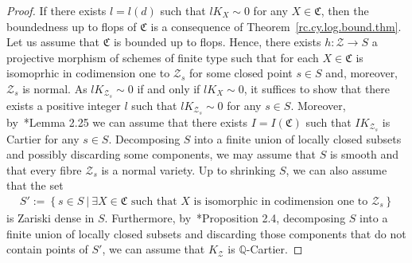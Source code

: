 \documentclass[11pt]{ip-journal}
\theoremstyle{definition}
\begin{document}
\begin{proof}
If there exists $l=l(d)$ such that $lK_X \sim 0$ for any $X \in \mathfrak{C}$, then the boundedness up to flops of $\mathfrak{C}$ is a consequence of Theorem~\ref{rc.cy.log.bound.thm}.
\newline
Let us assume that $\mathfrak{C}$ is bounded up to flops.
Hence, there exists  $h\colon \mathcal{Z}\rightarrow S$ a projective morphism of schemes of finite type such that for each $X\in \mathfrak{C}$ is isomoprhic in codimension one to $\mathcal{Z}_s$ for some closed point $s\in S$ and, moreover, $\mathcal{Z}_s$ is normal.
As $lK_{\mathcal{Z}_s} \sim 0$ if and only if $lK_X \sim 0$, it suffices to show that there exists a positive integer $l$ such that $lK_{\mathcal{Z}_s} \sim 0$ for any $s \in S$.
Moreover, by~\cite{Bir16a}*{Lemma 2.25} we can assume that there exists $I=I(\mathfrak C)$ such that $IK_{\mathcal{Z}_s}$ is Cartier for any $s \in S$.
\newline
Decomposing $S$ into a finite union of locally closed subsets and possibly discarding some components, we may assume that $S$ is smooth and that every fibre $\mathcal{Z}_s$ is a normal variety.
Up to shrinking $S$, we can also assume that the set 
\begin{align*}
    S' := 
    \left\{
    s\in S \ \vert \ 
    \exists X \in \mathfrak{C} 
    \textrm{ such that } X \textrm{ is isomorphic in codimension one to } 
    \mathcal{Z}_s
    \right\}
\end{align*}
is Zariski dense in $S$.
Furthermore, by~\cite{HX}*{Proposition 2.4}, decomposing $S$ into a finite union of locally closed subsets and discarding those components that do not contain points of $S'$, we can assume that $K_\mathcal{Z}$ is $\mathbb{Q}$-Cartier.

\medskip


\end{proof}
\end{document}
